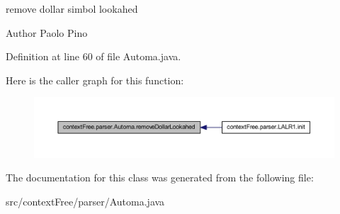 remove dollar simbol lookahed 

\begin{DoxyAuthor}{Author}
Paolo Pino 
\end{DoxyAuthor}


Definition at line 60 of file Automa.\-java.



Here is the caller graph for this function\-:
\nopagebreak
\begin{figure}[H]
\begin{center}
\leavevmode
\includegraphics[width=350pt]{classcontext_free_1_1parser_1_1_automa_ad94ecd3a9f8850220f86b6c54b751f78_icgraph}
\end{center}
\end{figure}




The documentation for this class was generated from the following file\-:\begin{DoxyCompactItemize}
\item 
src/context\-Free/parser/Automa.\-java\end{DoxyCompactItemize}
